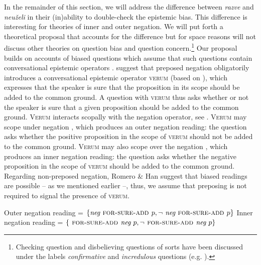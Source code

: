 \documentclass[output=paper,colorlinks,citecolor=brown]{langscibook}
\begin{document}
In the remainder of this section, we will address the difference between \textit{razve} and \textit{neuželi} in their (in)ability to double-check the epistemic bias. This difference is interesting for theories of inner and outer negation. We will put forth a theoretical proposal that accounts for the difference but for space reasons will not discuss other theories on question bias and question concern.\footnote[8]{Checking question and disbelieving questions of sorts have been discussed under the labels \textit{confirmative} and \textit{incredulous} questions (e.g. \citealt{jeong18, rudin18, goodhue21:lsa}).} Our proposal builds on accounts of biased questions which assume that such questions contain conversational epistemic operators \citep{romerohan2004negative, Repp06, repp_negation_2009, Repp13, Romero15}. \citet{romerohan2004negative} suggest that preposed negation obligatorily introduces a conversational epistemic operator \textsc{verum} (based on \citealt{hoehle88, hohle_uber_1992}), which expresses that the speaker is sure that the proposition in its scope should be added to the common ground. A question with \textsc{verum} thus asks whether or not the speaker is sure that a given proposition should be added to the common ground. \textsc{Verum} interacts scopally with the negation operator, see . \textsc{Verum} may scope under negation , which produces an outer negation reading: the question asks whether the positive proposition in the scope of \textsc{verum} should not be added to the common ground. \textsc{Verum} may also scope over the negation , which produces an inner negation reading: the question asks whether the negative proposition in the scope of \textsc{verum} should be added to the common ground. Regarding non-preposed negation, Romero \& Han suggest that biased readings are possible – as we mentioned earlier –, thus, we assume that preposing is not required to signal the presence of \textsc{verum}.

\ea \label{read:neg}
\ea \label{read:neg:out}
Outer negation reading 
 = $\{\textit{neg} \textsc{ for-sure-add } p, \neg\textit{ neg} \textsc{ for-sure-add } p \}$
\ex \label{read:neg:inner}
Inner negation reading
 = $\{\textsc{ for-sure-add } \textit{neg } p, \neg\textsc{ for-sure-add } \textit{neg } p \}$
\z
\z
\end{document}
